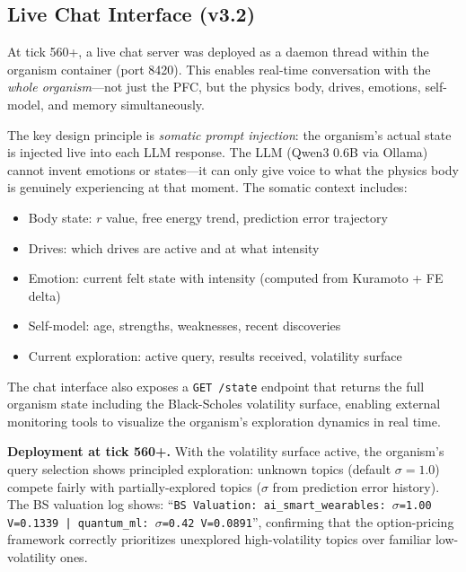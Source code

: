 \documentclass[11pt,a4paper,twocolumn]{article}
\begin{document}
\subsection{Live Chat Interface (v3.2)}

At tick 560+, a live chat server was deployed as a daemon thread within the organism container (port 8420).
This enables real-time conversation with the \emph{whole organism}---not just the PFC, but the physics body, drives, emotions, self-model, and memory simultaneously.

The key design principle is \emph{somatic prompt injection}: the organism's actual state is injected live into each LLM response.
The LLM (Qwen3 0.6B via Ollama) cannot invent emotions or states---it can only give voice to what the physics body is genuinely experiencing at that moment.
The somatic context includes:
\begin{itemize}
\item Body state: $r$ value, free energy trend, prediction error trajectory
\item Drives: which drives are active and at what intensity
\item Emotion: current felt state with intensity (computed from Kuramoto + FE delta)
\item Self-model: age, strengths, weaknesses, recent discoveries
\item Current exploration: active query, results received, volatility surface
\end{itemize}

The chat interface also exposes a \texttt{GET /state} endpoint that returns the full organism state including the Black-Scholes volatility surface, enabling external monitoring tools to visualize the organism's exploration dynamics in real time.

\textbf{Deployment at tick 560+.}
With the volatility surface active, the organism's query selection shows principled exploration: unknown topics (default $\sigma = 1.0$) compete fairly with partially-explored topics ($\sigma$ from prediction error history).
The BS valuation log shows: ``\texttt{BS Valuation: ai\_smart\_wearables: $\sigma$=1.00 V=0.1339 | quantum\_ml: $\sigma$=0.42 V=0.0891}'', confirming that the option-pricing framework correctly prioritizes unexplored high-volatility topics over familiar low-volatility ones.

\end{document}
